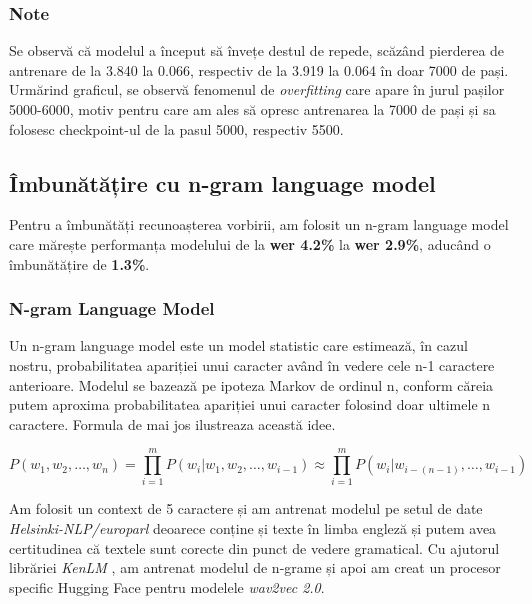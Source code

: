 \subsubsection{Note}
Se observă că modelul a început să învețe destul de repede, scăzând pierderea de antrenare
de la 3.840 la 0.066, respectiv de la 3.919 la 0.064 în doar 7000 de pași. Urmărind graficul,
se observă fenomenul de \textit{overfitting} care apare în jurul pașilor 5000-6000, motiv
pentru care am ales să opresc antrenarea la 7000 de pași și sa folosesc checkpoint-ul de
la pasul 5000, respectiv 5500.




\subsection{Îmbunătățire cu n-gram language model}
Pentru a îmbunătăți recunoașterea vorbirii, am folosit un n-gram language model care 
mărește performanța modelului de la \textbf{wer 4.2\%}  la \textbf{wer 2.9\%}, aducând
o îmbunătățire de \textbf{1.3\%}.

\subsubsection{N-gram Language Model}
Un n-gram language model este un model statistic care estimează, în cazul nostru, probabilitatea
apariției unui caracter având în vedere cele n-1 caractere anterioare. Modelul se bazează pe
ipoteza Markov de ordinul n, conform căreia putem aproxima probabilitatea apariției unui caracter
folosind doar ultimele n caractere. Formula de mai jos ilustreaza această idee.

\begin{equation}
    P(w_1, w_2, \ldots, w_n) = \prod_{i=1}^{m} P(w_i | w_{1}, w_{2}, \ldots, w_{i-1}) \approx \prod_{i=1}^{m} P(w_i | w_{i-(n-1)}, \ldots, w_{i-1})
\end{equation}
\vspace{1em}

\par
Am folosit un context de 5 caractere și am antrenat modelul pe
setul de date \textit{Helsinki-NLP/europarl} \cite{tiedemann-2012-parallel} deoarece conține și
texte în limba engleză și putem avea certitudinea că textele sunt corecte din punct de vedere
gramatical. Cu ajutorul librăriei \textit{KenLM} \cite{heafield-2011-kenlm}, am antrenat modelul
de n-grame și apoi am creat un procesor specific Hugging Face pentru modelele \textit{wav2vec 2.0}.

